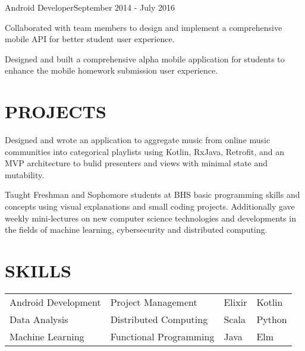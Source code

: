 \documentclass[10pt]{article}
\begin{document}
                  	 
                {Android Developer}{September 2014 - July 2016}
                 			\begin{accomplishments}					        
                   			\item Collaborated with team members to design and implement a comprehensive mobile API for better student user experience.
                   			\item Designed and built a comprehensive alpha mobile application for students to enhance the mobile homework submission user experience.
                  		 \end{accomplishments}
                  		 
                  
\section*{PROJECTS}
                 {Designed and wrote an application to aggregate music from online music communities into categorical playlists using Kotlin, RxJava, Retrofit, and an MVP architecture to bulid presenters and views with minimal state and mutability.}
                
							{Taught Freshman and Sophomore students at BHS basic programming skills and concepts using visual explanations and small coding projects. Additionally gave weekly mini-lectures on new computer science technologies and developments in the fields of machine learning, cybersecurity and distributed computing.}

\section*{SKILLS}
				\setlength{\columnsep}{1pt}
				\begin{tabu}{X[2c]X[2c]X[c]X[c]}
					Android Development  & Project Management & Elixir& Kotlin \\
					Data Analysis 			   & Distributed Computing & Scala & Python \\
					Machine Learning		   & Functional Programming & Java & Elm \\
				\end{tabu}
 
\end{document}
